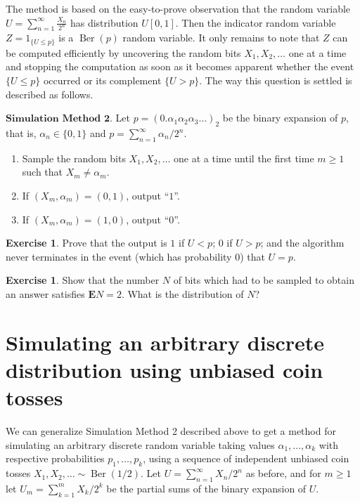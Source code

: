 \documentclass[11pt]{report}
\theoremstyle{plain}
\theoremstyle{definition}
\newtheorem{xexercise}[thm]{Exercise}
\begin{document}
The method is based on the easy-to-prove observation
that the random variable
$U=\sum_{n=1}^\infty \frac{X_n}{2^n}$ has
distribution $U[0,1]$. Then the indicator random
variable $Z = 1_{\{U\le p\}}$ is a
$\operatorname{Ber}(p)$ random variable. It only
remains to note that $Z$ can be computed efficiently
by uncovering the random bits $X_1,X_2,\ldots$ one at
a time and stopping the computation as soon as it
becomes apparent whether the event $\{U\le p\}$
occurred or its complement $\{U>p\}$. The way this
question is settled is described as follows.

$\textbf{Simulation Method 2.}$ Let
$p=(0.\alpha_1 \alpha_2 \alpha_3 \ldots )_2$ be the
binary expansion of $p$, that is,
$\alpha_n\in \{0,1\}$ and
$p=\sum_{n=1}^\infty \alpha_n/2^{n}$.

\begin{enumerate}[label=\arabic*.]
\item Sample the random bits $X_1,X_2,\ldots$ one at a time
until the first time $m\ge1$ such that
$X_m \neq \alpha_m$.

\item If $(X_m,\alpha_m)=(0,1)$, output ``$1$''.

\item If $(X_m,\alpha_m)=(1,0)$, output ``$0$''.
\end{enumerate}

\begin{xexercise}
Prove that the output is $1$ if $U< p$; $0$ if $U>p$;
and the algorithm never terminates in the event (which
has probability 0) that $U=p$.
\end{xexercise}

\begin{xexercise}
Show that the number $N$ of bits which had to be
sampled to obtain an answer satisfies
$\mathbf{E} N = 2$. What is the distribution of $N$?
\end{xexercise}

\section{Simulating an arbitrary discrete distribution using unbiased coin tosses}

We can generalize Simulation Method 2 described above
to get a method for simulating an arbitrary discrete
random variable taking values
$\alpha_1,\ldots,\alpha_k$ with respective
probabilities $p_1,\ldots,p_k$, using a sequence of
independent unbiased coin tosses
$X_1,X_2,\ldots \sim \operatorname{Ber}(1/2)$. Let
$U=\sum_{n=1}^\infty X_n/2^n$ as before, and for
$m\ge 1$ let $U_m = \sum_{k=1}^m X_k/2^k$ be the
partial sums of the binary expansion of $U$.
\end{document}
